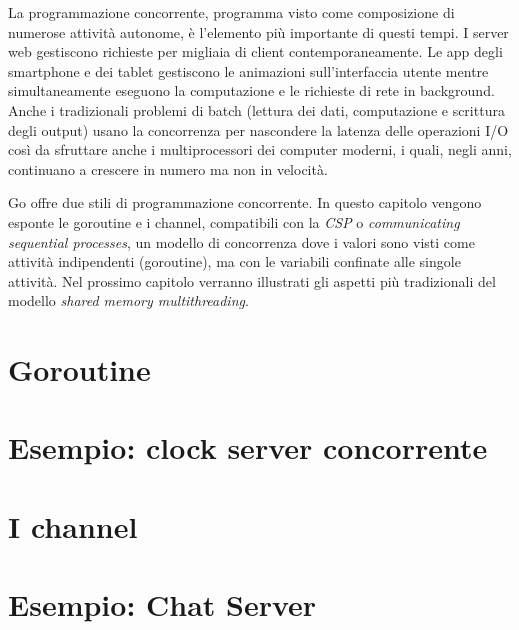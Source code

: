 La programmazione concorrente, programma visto come composizione di numerose attività autonome, è l'elemento più importante di questi tempi.
I server web gestiscono richieste per migliaia di client contemporaneamente.
Le app degli smartphone e dei tablet gestiscono le animazioni sull'interfaccia utente mentre simultaneamente eseguono la computazione e le richieste di rete in background.
Anche i tradizionali problemi di batch (lettura dei dati, computazione e scrittura degli output) usano la concorrenza per nascondere la latenza delle operazioni I/O così da sfruttare anche i multiprocessori dei computer moderni, i quali, negli anni, continuano a crescere in numero ma non in velocità.

Go offre due stili di programmazione concorrente.
In questo capitolo vengono esponte le goroutine e i channel, compatibili con la \textit{CSP} o \textit{communicating sequential processes}, un modello di concorrenza dove i valori sono visti come attività indipendenti (goroutine), ma con le variabili confinate alle singole attività.
Nel prossimo capitolo verranno illustrati gli aspetti più tradizionali del modello \textit{shared memory multithreading}.


\section{Goroutine}
\label{sec:goroutine}%



\section{Esempio: clock server concorrente}
\label{sec:esempio_clock_server_concorrente}


\section{I channel}
\label{sec:channel}


\section{Esempio: Chat Server}
\label{sec:esempio_chat_server}


